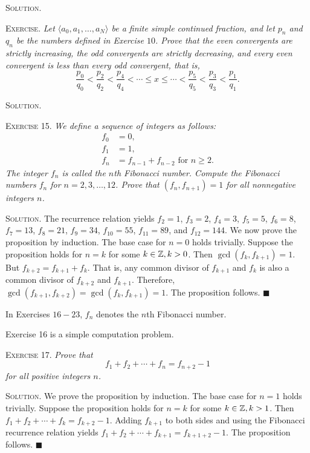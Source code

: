 \documentclass[11pt, leqno]{article}
\newcommand{\done}{\ensuremath{\blacksquare}}
\begin{document}
\textsc{Solution}.

\textsc{Exercise}. \emph{Let $\langle a_0, a_1, \ldots, a_N\rangle$ be a finite simple continued fraction, and let $p_n$ and $q_n$ be the numbers defined in Exercise $10$. Prove that the even convergents are strictly increasing, the odd convergents are strictly decreasing, and every even convergent is less than every odd convergent, that is, 
\begin{displaymath}
\frac{p_0}{q_0} < \frac{p_2}{q_2} < \frac{p_4}{q_4} < \cdots \leq x \leq \cdots < \frac{p_5}{q_5} < \frac{p_3}{q_3} < \frac{p_1}{q_1}.
\end{displaymath}}

\textsc{Solution}. 

\textsc{Exercise 15}. \emph{We define a sequence of integers as follows: 
\begin{align*}
  f_0 &= 0,\\
  f_1 &= 1,\\
  f_n &= f_{n-1} + f_{n-2} \text{ for } n\geq 2.
\end{align*}The integer $f_n$ is called the $n$th Fibonacci number. Compute the Fibonacci numbers $f_n$ for $n= 2,3,\ldots, 12$. Prove that $(f_n, f_{n+1}) = 1$ for all nonnegative integers $n$.}

\textsc{Solution}. The recurrence relation yields $f_2=1$, $f_3=2$, $f_4=3$, $f_5 = 5$, $f_6 = 8$, $f_7 = 13$, $f_8 = 21$, $f_9 = 34$, $f_{10} = 55$, $f_{11} = 89$, and $f_{12} = 144$. We now prove the proposition by induction. The base case for $n=0$ holds trivially. Suppose the proposition holds for $n=k$ for some $k\in\mathbb{Z}, k>0$. Then $\gcd(f_k, f_{k+1}) = 1$. But $f_{k+2} = f_{k+1} + f_k$. That is, any common divisor of $f_{k+1}$ and $f_k$ is also a common divisor of $f_{k+2}$ and $f_{k+1}$. Therefore, $\gcd(f_{k+1}, f_{k+2}) = \gcd(f_k, f_{k+1}) = 1$. The proposition follows. \done

In Exercises $16-23$, $f_n$ denotes the $n$th Fibonacci number.

Exercise 16 is a simple computation problem.

\textsc{Exercise 17}. \emph{Prove that 
\begin{displaymath}
f_1 + f_2 + \cdots + f_n = f_{n+2} - 1
\end{displaymath}
for all positive integers $n$.}

\textsc{Solution}. We prove the proposition by induction. The base case for $n=1$ holds trivially. Suppose the proposition holds for $n=k$ for some $k\in\mathbb{Z}, k>1$. Then $f_1 + f_2 + \cdots + f_k = f_{k+2} - 1$. Adding $f_{k+1}$ to both sides and using the Fibonacci recurrence relation yields $f_1 + f_2 + \cdots + f_{k+1} = f_{k+1+2} - 1$. The proposition follows. \done
\end{document}
